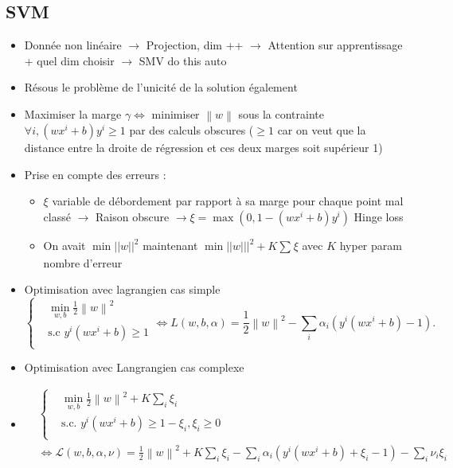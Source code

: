\documentclass{article}
\begin{document}
\begin{multicols}{2}
\section{SVM}
\begin{itemize}
    \item Donnée non linéaire $\rightarrow$ Projection, dim ++ $\rightarrow$ Attention sur apprentissage + quel dim choisir $\rightarrow$ SMV do this auto
    \item Résous le problème de l'unicité de la solution également
    \item Maximiser la marge $ \gamma  \Leftrightarrow $ minimiser $ \left\| w \right\| $ sous la contrainte $ \forall i, (wx^i + b)y^i \geq 1 $ par des calculs obscures ($ \geq 1 $ car on veut que la distance entre la droite de régression et ces deux marges soit supérieur 1)
    \item Prise en compte des erreurs : \begin{itemize}
        \item $ \xi  $ variable de débordement par rapport à sa marge pour chaque point mal classé $\rightarrow$ Raison obscure $\rightarrow \xi = \max (0, 1 - (wx^i + b) y^i) $ Hinge loss
        \item On avait $\min ||w||^2$ maintenant $\min ||w|||^2 + K \sum_{}^{}\xi $ avec $K$ hyper param nombre d'erreur
    \end{itemize}
    \item Optimisation avec lagrangien cas simple
    \[
        \begin{cases}
            & \min _{w,b} \frac{1}{2}\left\| w \right\| ^2\\
        &\text{s.c } y^i (wx^i + b) \geq 1\\
    \end{cases} 
        \Leftrightarrow L(w, b, \alpha) = \frac{1}{2} \left\| w \right\| ^2 - \sum_{i}^{}\alpha _i (y^i (wx^i + b) - 1)
    .\]
    \item Optimisation avec Langrangien cas complexe 
    \item \begin{align*}
        &\begin{cases}
            &\min _{w,b} \frac{1}{2}\left\| w \right\| ^2 + K \sum_{i}^{}\xi _i \\
            &\text{s.c. } y^i (wx^i + b) \geq 1 - \xi _i, \xi _i \geq 0 \\
        \end{cases} \\ 
        &\Leftrightarrow \mathcal{L}(w, b, \alpha , \nu ) = \frac{1}{2}\left\| w \right\| ^2 + K \sum_{i}^{} \xi _i - \sum_{i}^{}\alpha _i (y^i(w x^i + b) + \xi _i - 1) - \sum_{i}^{}\nu _i \xi _i 
    \end{align*}
        

\end{itemize}
\end{multicols}
\end{document}
